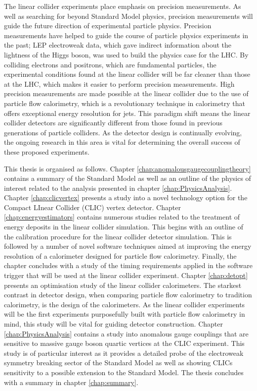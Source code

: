 The linear collider experiments place emphasis on precision measurements.  As well as searching for beyond Standard Model physics, precision measurements will guide the future direction of experimental particle physics.  Precision measurements have helped to guide the course of particle physics experiments in the past; LEP electroweak data, which gave indirect information about the lightness of the Higgs boson, was used to build the physics case for the LHC.  By colliding electrons and positrons, which are fundamental particles, the experimental conditions found at the linear collider will be far cleaner than those at the LHC, which makes it easier to perform precision measurements.  High precision measurements are made possible at the linear collider due to the use of particle flow calorimetry, which is a revolutionary technique in calorimetry that offers exceptional energy resolution for jets.  This paradigm shift means the linear collider detectors are significantly different from those found in previous generations of particle colliders.  As the detector design is continually evolving, the ongoing research in this area is vital for determining the overall success of these proposed experiments.  

This thesis is organised as follows.  Chapter \ref{chap:anomalousgaugecouplingtheory} contains a summary of the Standard Model as well as an outline of the physics of interest related to the analysis presented in chapter \ref{chap:PhysicsAnalysis}.  Chapter \ref{chap:clicvertex} presents a study into a novel technology option for the Compact LInear Collider (CLIC) vertex detector.  Chapter \ref{chap:energyestimators} contains numerous studies related to the treatment of energy deposits in the linear collider simulation.  This begins with an outline of the calibration procedure for the linear collider detector simulation.  This is followed by a number of novel software techniques aimed at improving the energy resolution of a calorimeter designed for particle flow calorimetry.  Finally, the chapter concludes with a study of the timing requirements applied in the software trigger that will be used at the linear collider experiment.  Chapter \ref{chap:detopt} presents an optimisation study of the linear collider calorimeters.  The starkest contrast in detector design, when comparing particle flow calorimetry to tradition calorimetry, is the design of the calorimeters.  As the linear collider experiments will be the first experiments purposefully built with particle flow calorimetry in mind, this study will be vital for guiding detector construction.  Chapter \ref{chap:PhysicsAnalysis} contains a study into anomalous gauge couplings that are sensitive to massive gauge boson quartic vertices at the CLIC experiment.  This study is of particular interest as it provides a detailed probe of the electroweak symmetry breaking sector of the Standard Model as well as showing CLICs sensitivity to a possible extension to the Standard Model.  The thesis concludes with a summary in chapter \ref{chap:summary}.

